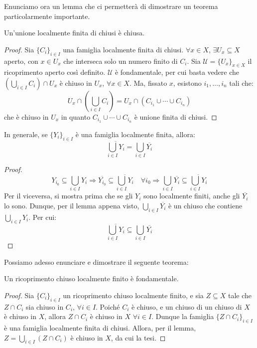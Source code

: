 Enunciamo ora un lemma che ci permetterà di dimostrare un teorema particolarmente importante.

\begin{lm}
Un'unione localmente finita di chiusi è chiusa.
\end{lm}
\begin{proof}
Sia $\{C_i\}_{i \in I}$ una famiglia localmente finita di chiusi. $\forall x \in X$, $\exists U_x \subseteq X$ aperto, con $x \in U_x$ che interseca solo un numero finito di $C_i$. Sia $\mathcal{U}=\{U_x\}_{x \in X}$ il ricoprimento aperto così definito. $\mathcal{U}$ è fondamentale, per cui basta vedere che $\left(\bigcup _{i \in I} C_i\right) \cap U_x$ è chiuso in $U_x$, $\forall x \in X$. Ma, fissato $x$, esistono $i_1, \dots ,i_n$ tali che:
$$U_x \cap \left(\bigcup _{i \in I} C_i\right) = U_x \cap (C_{i_1} \cup \cdots \cup C_{i_n})$$
che è chiuso in $U_x$ in quanto $C_{i_1} \cup \cdots \cup C_{i_n}$ è unione finita di chiusi.
\end{proof}

\begin{cor}
In generale, se $\{Y_i\}_{i \in I}$ è una famiglia localmente finita, allora:
$$\overline{\bigcup _{i \in I} Y_i}=\bigcup _{i \in I} \overline{Y_i}$$
\end{cor}
\begin{proof}
$$Y_{i_0} \subseteq \bigcup _{i \in I} Y_i \Longrightarrow \overline{Y_{i_0}} \subseteq \overline{\bigcup _{i \in I} Y_i} \quad \forall i_0 \Longrightarrow \bigcup _{i \in I} \overline{Y_i} \subseteq \overline{\bigcup _{i \in I} Y_i}$$
Per il viceversa, si mostra prima che se gli $Y_i$ sono localmente finiti, anche gli $\overline{Y_i}$ lo sono. Dunque, per il lemma appena visto, $\bigcup _{i \in I} \overline{Y_i}$ è un chiuso che contiene $\bigcup _{i \in I} Y_i$. Per cui:
$$\overline{\bigcup _{i \in I} Y_i} \subseteq \bigcup _{i \in I} \overline{Y_i}$$
\end{proof}

Possiamo adesso enunciare e dimostrare il seguente teorema:
\begin{thm}
Un ricoprimento chiuso localmente finito è fondamentale.
\end{thm}
\begin{proof}
Sia $\{C_i\} _{i \in I}$ un ricoprimento chiuso localmente finito, e sia $Z \subseteq X$ tale che $Z \cap C_i$ sia chiuso in $C_i$, $\forall i \in I$. Poiché $C_i$ è chiuso, e un chiuso di un chiuso di $X$ è chiuso in $X$, allora $Z \cap C_i$ è chiuso in $X$ $\forall i \in I$. Dunque la famiglia $\{Z \cap C_i \} _{i \in I}$ è una famiglia localmente finita di chiusi. Allora, per il lemma, $Z=\bigcup _{i \in I} (Z \cap C_i)$ è chiuso in $X$, da cui la tesi.
\end{proof}